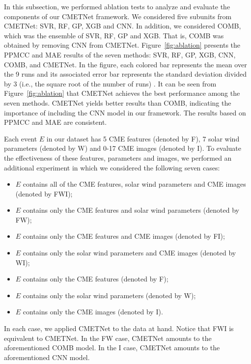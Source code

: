 \documentclass{article}
\begin{document}
In this subsection, we performed ablation tests to analyze and
evaluate the components of our CMETNet framework. 
We considered five subunits from  CMETNet:
SVR, RF, GP, XGB and CNN.
In addition, we considered COMB, which was the ensemble of SVR, RF, GP and XGB.
That is, COMB was obtained by removing CNN from CMETNet.
Figure~\ref{fig:ablation} presents the PPMCC and MAE results of the seven methods: 
SVR, RF, GP, XGB, CNN, COMB, and CMETNet. 
In the figure, 
each colored bar represents the mean over the 9 runs and its associated error bar represents the standard deviation divided by 3 (i.e., the square root of the number of runs) \citep{2022XGBoostSYMHbyIong}.
It can be seen from Figure~\ref{fig:ablation} that CMETNet achieves the best performance among the seven methods. CMETNet yields better results than COMB, indicating the importance of including the CNN model in our framework. 
The results based on PPMCC and MAE are consistent.

Each event $E$ in our dataset has 5 CME features
(denoted by F),
7 solar wind parameters (denoted by W) and
0-17 CME images (denoted by I).
To evaluate the effectiveness of these features, parameters and images,
we performed an additional experiment in which we considered the following seven cases:
\begin{itemize}
    \item $E$ contains all of the CME features, solar wind parameters and CME images (denoted by FWI);
   \item
   $E$ contains only the CME features and solar wind parameters (denoted by FW);
   \item
   $E$ contains only the CME features and CME images (denoted by FI);
   \item
   $E$ contains only the solar wind parameters and CME images (denoted by WI);
   \item
   $E$ contains only the CME features (denoted by F);
   \item
   $E$ contains only the solar wind parameters (denoted by W);
   \item
   $E$ contains only the CME images (denoted by I).
\end{itemize}
In each case, we applied CMETNet to the data at hand.
Notice that 
FWI is equivalent to CMETNet.
In the FW case, 
CMETNet amounts to the aforementioned COMB model.
In the I case, CMETNet amounts to the aforementioned CNN model.
\end{document}
